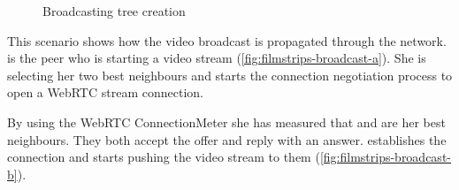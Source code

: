 \begin{figure}[htb!]
	\caption{Broadcasting tree creation}
\label{fig:filmstrips-broadcast}
\end{figure}

This scenario shows how the video broadcast is propagated through the network. \claire is the peer who is starting a video stream (\vref{fig:filmstrips-broadcast-a}). 
She is selecting her two best neighbours and starts the connection negotiation process to open a WebRTC stream connection. 

By using the WebRTC ConnectionMeter she has measured that \alice and \bob are her best neighbours. They both accept the offer and reply with an answer. \claire establishes the connection and starts pushing the video stream to them (\vref{fig:filmstrips-broadcast-b}).

